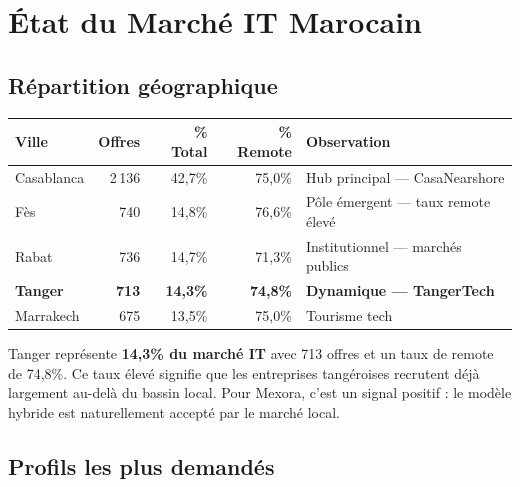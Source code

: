 \documentclass[12pt,a4paper]{article}
\begin{document}
\section{État du Marché IT Marocain}

\subsection{Répartition géographique}

\begin{center}
\renewcommand{\arraystretch}{1.3}
\begin{tabularx}{\textwidth}{l r r r X}
\toprule
\textbf{Ville} & \textbf{Offres} & \textbf{\% Total} & \textbf{\% Remote} & \textbf{Observation} \\
\midrule
Casablanca & 2\,136 & 42,7\% & 75,0\% & Hub principal --- CasaNearshore \\
Fès & 740 & 14,8\% & 76,6\% & Pôle émergent --- taux remote élevé \\
Rabat & 736 & 14,7\% & 71,3\% & Institutionnel --- marchés publics \\
\rowcolor{mexlight} \textbf{Tanger} & \textbf{713} & \textbf{14,3\%} & \textbf{74,8\%} & \textbf{Dynamique --- TangerTech} \\
Marrakech & 675 & 13,5\% & 75,0\% & Tourisme tech \\
\bottomrule
\end{tabularx}
\end{center}

\begin{keybox}
Tanger représente \textbf{14,3\% du marché IT} avec 713 offres et un taux de remote de 74,8\%. Ce taux élevé signifie que les entreprises tangéroises recrutent déjà largement au-delà du bassin local. Pour Mexora, c'est un signal positif : le modèle hybride est naturellement accepté par le marché local.
\end{keybox}

\subsection{Profils les plus demandés}
\end{document}
